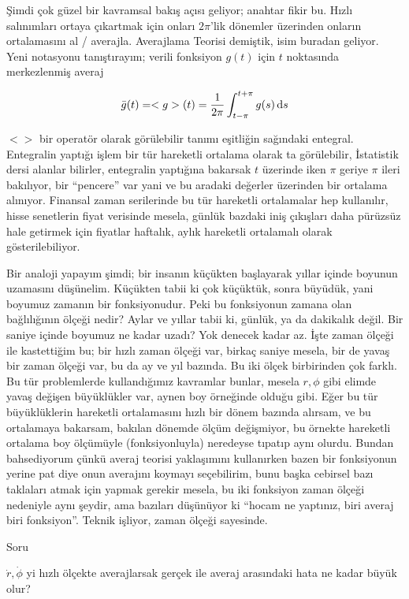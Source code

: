 \documentclass[12pt,fleqn]{article}\usepackage{../../common}
\begin{document}
Şimdi çok güzel bir kavramsal bakış açısı geliyor; anahtar fikir bu. Hızlı
salınımları ortaya çıkartmak için onları $2\pi$'lik dönemler üzerinden onların
ortalamasını al / averajla. Averajlama Teorisi demiştik, isim buradan
geliyor. Yeni notasyonu tanıştırayım; verili fonksiyon $g(t)$ için $t$
noktasında merkezlenmiş averaj

$$ \bar{g}(t) = <g>(t) = \frac{1}{2\pi} \int_{t-\pi}^{t+\pi} g(s) \,\mathrm{d} s$$

$<>$ bir operatör olarak görülebilir tanımı eşitliğin sağındaki
entegral. Entegralin yaptığı işlem bir tür hareketli ortalama olarak ta
görülebilir, İstatistik dersi alanlar bilirler, entegralin yaptığına bakarsak
$t$ üzerinde iken $\pi$ geriye $\pi$ ileri bakılıyor, bir ``pencere'' var yani
ve bu aradaki değerler üzerinden bir ortalama alınıyor. Finansal zaman
serilerinde bu tür hareketli ortalamalar hep kullanılır, hisse senetlerin fiyat
verisinde mesela, günlük bazdaki iniş çıkışları daha pürüzsüz hale getirmek için
fiyatlar haftalık, aylık hareketli ortalamalı olarak gösterilebiliyor.

Bir analoji yapayım şimdi; bir insanın küçükten başlayarak yıllar içinde boyunun
uzamasını düşünelim. Küçükten tabii ki çok küçüktük, sonra büyüdük, yani
boyumuz zamanın bir fonksiyonudur. Peki bu fonksiyonun zamana olan bağlılığının
ölçeği nedir? Aylar ve yıllar tabii ki, günlük, ya da dakikalık değil. Bir
saniye içinde boyumuz ne kadar uzadı? Yok denecek kadar az. İşte zaman ölçeği
ile kastettiğim bu; bir hızlı zaman ölçeği var, birkaç saniye mesela, bir de
yavaş bir zaman ölçeği var, bu da ay ve yıl bazında. Bu iki ölçek birbirinden
çok farklı. Bu tür problemlerde kullandığımız kavramlar bunlar, mesela $r,\phi$
gibi elimde yavaş değişen büyüklükler var, aynen boy örneğinde olduğu gibi. Eğer
bu tür büyüklüklerin hareketli ortalamasını hızlı bir dönem bazında alırsam, ve
bu ortalamaya bakarsam, bakılan dönemde ölçüm değişmiyor, bu örnekte hareketli
ortalama boy ölçümüyle (fonksiyonluyla) neredeyse tıpatıp aynı olurdu. Bundan
bahsediyorum çünkü averaj teorisi yaklaşımını kullanırken bazen bir fonksiyonun
yerine pat diye onun averajını koymayı seçebilirim, bunu başka cebirsel bazı
taklaları atmak için yapmak gerekir mesela, bu iki fonksiyon zaman ölçeği
nedeniyle aynı şeydir, ama bazıları düşünüyor ki ``hocam ne yaptınız, biri
averaj biri fonksiyon''. Teknik işliyor, zaman ölçeği sayesinde. 

Soru

$\dot{r},\dot{\phi}$ yi hızlı ölçekte averajlarsak gerçek ile averaj arasındaki
hata ne kadar büyük olur? 
\end{document}
